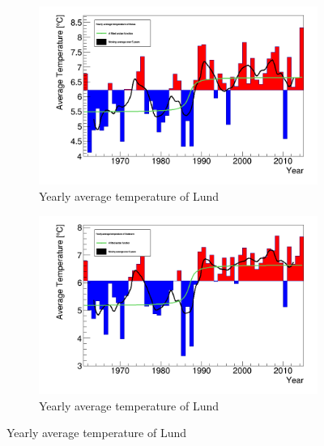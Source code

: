 \begin{figure}
\begin{subfigure}[b]{0.49\lidwidth}
		\includegraphics[width=14cm]{yearAvg_Boras.png}
		\caption{Yearly average temperature of Lund}
		\label{Boras}
	\end{subfigure}
	\begin{subfigure}[b]{0.49\lidwidth}
		\includegraphics[width=14cm]{yearAvg_Soderarm.png}
		\caption{Yearly average temperature of Lund}
		\label{Soderarm}
	\end{subfigure}
\end{figure}
